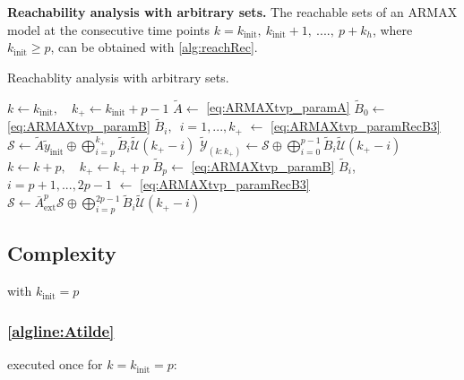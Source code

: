 \documentclass{article}
\begin{document}
\begin{theorem}\label{theo:reach_gen}\textbf{Reachability analysis with arbitrary sets.}
The reachable sets of an ARMAX model at the consecutive time points $k=k_{\text{init}},~k_{\text{init}}+1,~ ....,~p+k_h$, where $k_{\text{init}} \geq p$, can be obtained with \cref{alg:reachRec}.
\begin{algorithm}[!h]
\caption{Reachablity analysis with arbitrary sets.}\label{alg:reachRec}
\begin{algorithmic}[1]
\State $k \gets k_{\text{init}},\quad k_+ \gets k_{\text{init}} +p-1$ 
\State $\tilde{A} \gets$ \cref{eq:ARMAXtvp_paramA} \label{algline:Atilde}
\State $\tilde{B}_0 \gets$ \cref{eq:ARMAXtvp_paramB}\label{algline:Btilde0}
\State $\tilde{B}_i,$~{\small $i=1,...,k_+$} $\gets$ \cref{eq:ARMAXtvp_paramRecB3}\label{algline:Btildei}
\State ${\mathcal{S}} \gets \tilde{A} \tilde{y}_\text{init} \oplus \bigoplus_{i=p}^{k_+} \tilde{B}_{i} \tilde{\mathcal{U}}(k_+-i)$ \label{algline:ARMAXtvp_S}
\State $\tilde{\mathcal{Y}}_{(k:k_+)} \gets{\mathcal{S}}\oplus \bigoplus_{i=0}^{p-1}  \tilde{B}_{i} \tilde{\mathcal{U}}(k_+-i)$ \label{algline:ARMAXtvp_reach} 
\State $k \gets k+p,\quad k_+ \gets k_+ +p$
 \label{algline:test} %
\State $\tilde{B}_p \gets$ \cref{eq:ARMAXtvp_paramB}\label{algline:ARMAXtvp_paramB2p} 
\State $\tilde{B}_i$, {\small $i=p+1,...,2p-1$} $\gets$ \cref{eq:ARMAXtvp_paramRecB3} \label{algline:ARMAXtvp_paramB2i}
\EndIf
\State ${\mathcal{S}} \gets \bar{A}_\text{ext}^{p} {\mathcal{S}}  \oplus \bigoplus_{i=p}^{2p-1} \tilde{B}_{i} \tilde{\mathcal{U}}(k_+-i)$  \label{algline:ARMAXtvp_SRec}
\EndWhile
\end{algorithmic}
\end{algorithm}
\end{theorem}


\subsection{Complexity}
with $k_{\text{init}} = p$
\subsubsection{\cref{algline:Atilde}} \label{sec:line2}
executed once for $k=k_{\text{init}}=p$:
\end{document}
